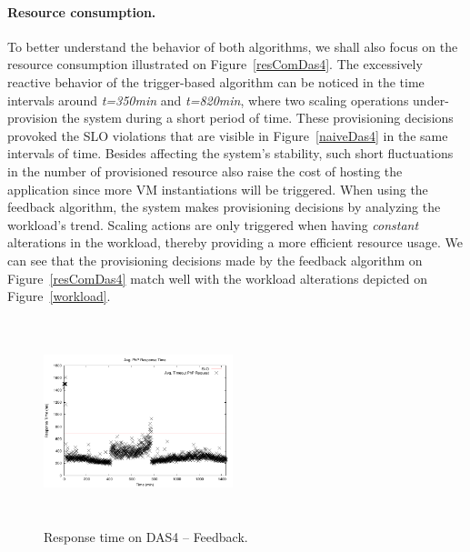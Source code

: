 \paragraph{Resource consumption.}

To better understand the behavior of both algorithms, we shall also
focus on the resource consumption illustrated on
Figure~\ref{resComDas4}. The excessively reactive behavior of the
trigger-based algorithm can be noticed in the time intervals
around \emph{t=350min} and \emph{t=820min}, where two scaling
operations under-provision the system during a short period of
time. These provisioning decisions provoked the SLO violations that
are visible in Figure~\ref{naiveDas4} in the same intervals of
time. Besides affecting the system's stability, such short
fluctuations in the number of provisioned resource also raise the cost
of hosting the application since more VM instantiations will be
triggered. When using the feedback algorithm, the system makes
provisioning decisions by analyzing the workload's trend. Scaling
actions are only triggered when having \emph{constant} alterations in
the workload, thereby providing a more efficient resource usage. We
can see that the provisioning decisions made by the feedback algorithm
on Figure~\ref{resComDas4} match well with the workload alterations
depicted on Figure~\ref{workload}.

\begin{figure}[t]
\begin{center}
\includegraphics[width=0.49\textwidth, height=6cm]{./images/homogeneous/avgTimeout_PhP_feedback}
\end{center}
\vspace{-5mm}
\caption{Response time on DAS4 -- Feedback.}
\label{historyDas4}
\end{figure}

